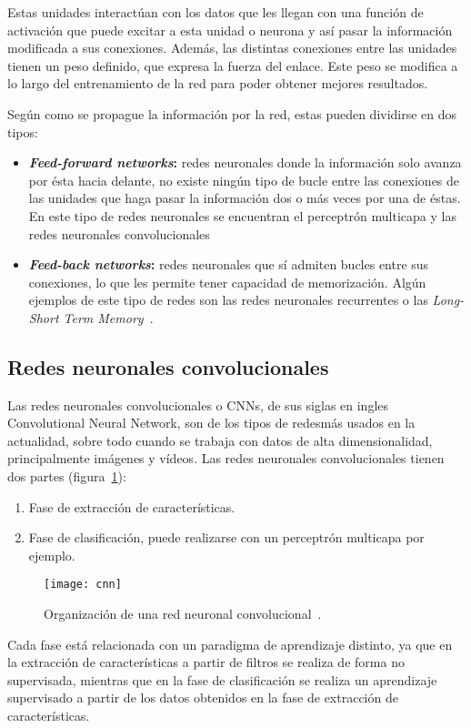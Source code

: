 Estas unidades interactúan con los datos que les llegan con una función de activación que puede excitar a esta unidad o neurona y así pasar la información modificada a sus conexiones. Además, las distintas conexiones entre las unidades tienen un peso definido, que expresa la fuerza del enlace. Este peso se modifica a lo largo del entrenamiento de la red para poder obtener mejores resultados.

Según como se propague la información por la red, estas pueden dividirse en dos tipos:
\begin{itemize}
	\item \textbf{\textit{Feed-forward networks}:} redes neuronales donde la información solo avanza por ésta hacia delante, no existe ningún tipo de bucle entre las conexiones de las unidades que haga pasar la información dos o más veces por una de éstas. En este tipo de redes neuronales se encuentran el perceptrón multicapa y las redes neuronales convolucionales
	\item \textbf{\textit{Feed-back networks}:} redes neuronales que sí admiten bucles entre sus conexiones, lo que les permite tener capacidad de memorización. Algún ejemplos de este tipo de redes son las redes neuronales recurrentes o las \textit{Long-Short Term Memory}~\cite{lstm}.
\end{itemize}
\subsection{Redes neuronales convolucionales}
Las redes neuronales convolucionales o CNNs, de sus siglas en ingles Convolutional Neural Network, son de los tipos de redesmás usados en la actualidad, sobre todo cuando se trabaja con datos de alta dimensionalidad, principalmente imágenes y vídeos. Las redes neuronales convolucionales tienen dos partes (figura~\ref{fig:cnn}):
\begin{enumerate}
	\item Fase de extracción de características.
	\item Fase de clasificación, puede realizarse con un perceptrón multicapa por ejemplo.
\end{enumerate}

\begin{figure}[h]
	\centering
	\texttt{[image: cnn]}
	\caption{Organización de una red neuronal convolucional~\cite{cnn}.}
	\label{fig:cnn}
\end{figure}

Cada fase está relacionada con un paradigma de aprendizaje distinto, ya que en la extracción de características a partir de filtros se realiza de forma no supervisada, mientras que en la fase de clasificación se realiza un aprendizaje supervisado a partir de los datos obtenidos en la fase de extracción de características.


